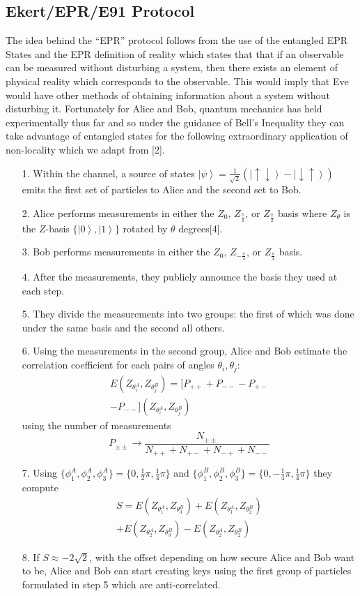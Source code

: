\documentclass[aps,prd,final,twocolumn,letterpaper]{revtex4}
\newcommand{\ket}[1]{\left|#1\right\rangle}
\begin{document}
\subsection{Ekert/EPR/E91 Protocol}
The idea behind the ``EPR'' protocol follows from the use of the entangled EPR States and the EPR definition of reality which states that that if an observable can be measured without disturbing a system, then there exists an element of physical reality which corresponds to the observable. This would imply that Eve would have other methods of obtaining information about a system without disturbing it. Fortunately for Alice and Bob, quantum mechanics has held experimentally thus far and so under the guidance of Bell's Inequality they can take advantage of entangled states for the following extraordinary application of non-locality which we adapt from [2].
\begin{itemize}
\item[1.] Within the channel, a source of states $\ket{\psi} =\frac{1}{\sqrt{2}}(\ket{\uparrow\downarrow}-\ket{\downarrow\uparrow})$ emits the first set of particles to Alice and the second set to Bob.
\item[2.] Alice performs measurements in either the $Z_0$, $Z_{\frac{\pi}{4}}$, or $Z_{\frac{\pi}{2}}$ basis where $Z_{\theta}$ is the $Z$-basis $\{\ket{0}, \ket{1}\}$ rotated by $\theta$ degrees[4].
\item[3.] Bob performs measurements in either the $Z_0$, $Z_{-\frac{\pi}{4}}$, or $Z_{\frac{\pi}{4}}$ basis.
\item[4.] After the measurements, they publicly announce the basis they used at each step.
\item[5.] They divide the measurements into two groups: the first of which was done under the same basis and the second all others.
\item[6.] Using the measurements in the second group, Alice and Bob estimate the correlation coefficient for each pairs of angles $\theta_i, \theta_j$: 
\begin{align}
E(Z_{\theta_i^A}, Z_{\theta_j^B}) = [P_{++} + P_{--}-P_{+-}\\-P_{--}](Z_{\theta_i^A}, Z_{\theta_j^B})\nonumber
\end{align}
using the number of measurements
 \begin{equation*}
P_{\pm \pm} \rightarrow \frac{N_{\pm\pm}}{N_{++}+N_{+-}+N_{-+}+N_{--}}
\end{equation*}
\item[7.] Using $\{\phi_1^A, \phi_2^A, \phi_3^A\} = \{0, \frac{1}{2}\pi, \frac{1}{4}\pi\}$ and $\{\phi_1^B, \phi_2^B, \phi_3^B\} = \{0, -\frac{1}{4}\pi, \frac{1}{4}\pi\}$ they compute 
\begin{align}
S=E(Z_{\theta_1^A}, Z_{\theta_3^B})+E(Z_{\theta_1^A}, Z_{\theta_2^B})\\+E(Z_{\theta_2^A}, Z_{\theta_3^B})-E(Z_{\theta_2^A}, Z_{\theta_2^B})\nonumber
\end{align}
\item[8.] If $S\approx -2\sqrt{2}$, with the offset depending on how secure Alice and Bob want to be, Alice and Bob can start creating keys using the first group of particles formulated in step 5 which are anti-correlated. 
\end{itemize} 
\end{document}
